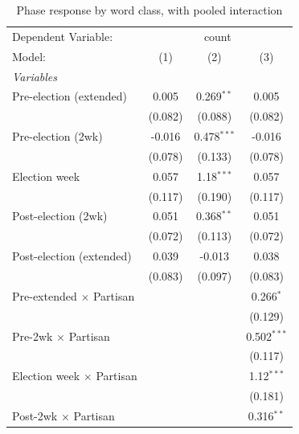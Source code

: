 
\begin{table}[htbp]
   \caption{\label{tab:nb-phase-3col} Phase response by word class, with pooled interaction}
   \centering
   \begin{tabular}{lccc}
      \tabularnewline \midrule \midrule
      Dependent Variable: & \multicolumn{3}{c}{count}\\
      Model:                           & (1)     & (2)           & (3)\\  
      \midrule
      \emph{Variables}\\
      Pre-election (extended)          & 0.005   & 0.269$^{**}$  & 0.005\\   
                                       & (0.082) & (0.088)       & (0.082)\\   
      Pre-election (2wk)               & -0.016  & 0.478$^{***}$ & -0.016\\   
                                       & (0.078) & (0.133)       & (0.078)\\   
      Election week                    & 0.057   & 1.18$^{***}$  & 0.057\\   
                                       & (0.117) & (0.190)       & (0.117)\\   
      Post-election (2wk)              & 0.051   & 0.368$^{**}$  & 0.051\\   
                                       & (0.072) & (0.113)       & (0.072)\\   
      Post-election (extended)         & 0.039   & -0.013        & 0.038\\   
                                       & (0.083) & (0.097)       & (0.083)\\   
      Pre-extended $\times$ Partisan   &         &               & 0.266$^{*}$\\   
                                       &         &               & (0.129)\\   
      Pre-2wk $\times$ Partisan        &         &               & 0.502$^{***}$\\   
                                       &         &               & (0.117)\\   
      Election week $\times$ Partisan  &         &               & 1.12$^{***}$\\   
                                       &         &               & (0.181)\\   
      Post-2wk $\times$ Partisan       &         &               & 0.316$^{**}$\\   

\end{tabular}
\end{table}
